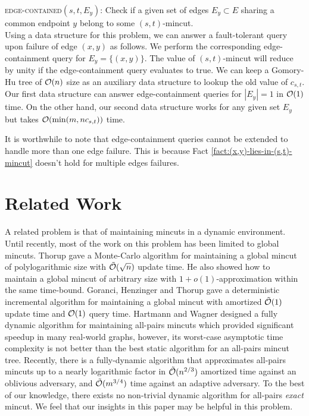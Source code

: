 \noindent
{\textsc{edge-contained}}$(s,t,E_y)$: Check if a given set of edges $E_y\subset E$ sharing a common endpoint $y$ belong to some $(s,t)$-mincut.\\

Using a data structure for this problem, we can answer a fault-tolerant query upon failure of edge $(x,y)$ as follows. We perform the corresponding edge-containment query for $E_y = \{(x,y)\}$. The value of $(s,t)$-mincut will reduce by unity if the edge-containment query evaluates to true. We can keep a Gomory-Hu tree of ${\cal O}(n)$ size as an auxiliary data structure to lookup the old value of $c_{s,t}$. Our first data structure can answer edge-containment queries for $|E_y|=1$ in  ${\cal O}(1)$ time. On the other hand, our second data structure works for any given set $E_y$ but takes ${\cal O}(\min(m,nc_{s,t}))$ time. 


\begin{remark}
It is worthwhile to note that edge-containment queries cannot be extended to handle more than one edge failure. This is because Fact \ref{fact:(x,y)-lies-in-(s,t)-mincut} doesn't hold for multiple edges failures.
\end{remark}




\section{Related Work} 
A related problem is that of maintaining mincuts in a dynamic environment. Until recently, most of the work on this problem has been limited to global mincuts. Thorup \cite{DBLP:journals/combinatorica/Thorup07} gave a Monte-Carlo algorithm for maintaining a global mincut of polylogarithmic size with ${\tilde {\cal O}}(\sqrt{n})$ update time.  He also showed how to maintain a global mincut of arbitrary size with $1+o(1)$-approximation within the same time-bound. Goranci, Henzinger and Thorup \cite{DBLP:journals/talg/GoranciHT18} gave a deterministic incremental algorithm for maintaining a global mincut with amortized ${\tilde{\cal O}}(1)$ update time and ${\cal O}(1)$ query time. Hartmann and Wagner \cite{DBLP:conf/isaac/HartmannW12} designed a fully dynamic algorithm for maintaining all-pairs mincuts  which provided significant speedup in many real-world graphs, however, its worst-case asymptotic time complexity is not better than the best static algorithm for an all-pairs mincut tree. Recently, there is a fully-dynamic algorithm \cite{DBLP:journals/corr/abs-2005-02368} that approximates all-pairs mincuts up to a nearly logarithmic factor in ${\tilde{\cal O}}(n^{2/3} )$ amortized time against an oblivious adversary, and ${\tilde{\cal O}}(m^{3/4} )$ time against an adaptive adversary. To the best of our knowledge, there exists no non-trivial dynamic algorithm for all-pairs \textit{exact} mincut. We feel that our insights in this paper may be helpful in this problem.

